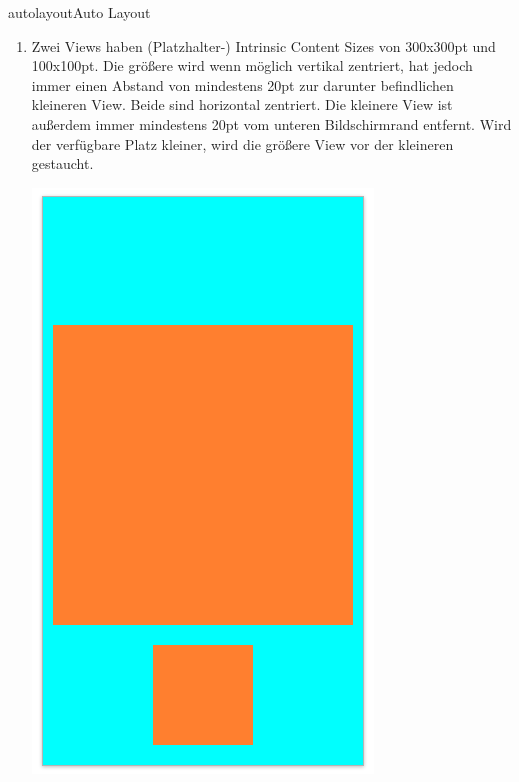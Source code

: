 \documentclass[parskip=half, final]{scrreprt}
\begin{document}
\begin{lecture}
\begin{exc}
\begin{excitem}{autolayout}{Auto Layout}
\begin{enumerate}
\item Zwei Views haben (Platzhalter-) Intrinsic Content Sizes von 300x300pt und 100x100pt. Die größere wird wenn möglich vertikal zentriert, hat jedoch immer einen Abstand von mindestens 20pt zur darunter befindlichen kleineren View. Beide sind horizontal zentriert. Die kleinere View ist außerdem immer mindestens 20pt vom unteren Bildschirmrand entfernt. Wird der verfügbare Platz kleiner, wird die größere View vor der kleineren gestaucht.

\begin{minipage}{.5\linewidth}
  \centering
  \includegraphics[width=\linewidth, height=\linewidth, keepaspectratio]{img/al_11.png}
\end{minipage}
\begin{minipage}{.5\linewidth}
  \centering

\end{minipage}
\end{enumerate}
\end{excitem}
\end{exc}
\end{lecture}
\end{document}
